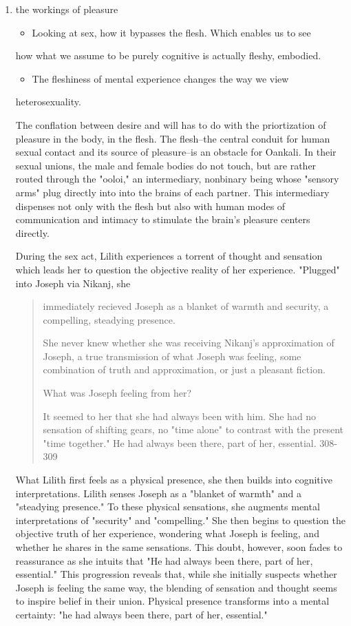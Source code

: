 \documentclass[11pt]{article}
\begin{document}
\begin{enumerate}
\item the workings of pleasure
\label{sec:org824832b}
\begin{itemize}
\item Looking at sex, how it bypasses the flesh. Which enables us to see
\end{itemize}
how what we assume to be purely cognitive is actually fleshy,
embodied. 
\begin{itemize}
\item The fleshiness of mental experience changes the way we view
\end{itemize}
heterosexuality. 

The conflation between desire and will has to do with the
priortization of pleasure in the body, in the flesh. The flesh--the
central conduit for human sexual contact and its source of
pleasure--is an obstacle for Oankali. In their sexual unions, the male
and female bodies do not touch, but are rather routed through the
"ooloi," an intermediary, nonbinary being whose "sensory arms" plug
directly into into the brains of each partner. This intermediary
dispenses not only with the flesh but also with human modes of
communication and intimacy to stimulate the brain's pleasure centers
directly.

During the sex act, Lilith experiences a torrent of thought and
sensation which leads her to question the objective reality of her
experience. "Plugged" into Joseph via Nikanj, she
\begin{quote}
immediately recieved Joseph as a blanket of warmth and security, a
compelling, steadying presence. 

She never knew whether she was receiving Nikanj's approximation of
Joseph, a true transmission of what Joseph was feeling, some
combination of truth and approximation, or just a pleasant fiction. 

What was Joseph feeling from her?

It seemed to her that she had always been with him. She had no
sensation of shifting gears, no "time alone" to contrast with the
present "time together." He had always been there, part of her,
essential. 308-309
\end{quote}
What Lilith first feels as a physical presence, she then builds into
cognitive interpretations. Lilith senses Joseph as a "blanket of
warmth" and a "steadying presence." To these physical sensations, she
augments mental interpretations of "security" and "compelling." She
then begins to question the objective truth of her experience,
wondering what Joseph is feeling, and whether he shares in the same
sensations. This doubt, however, soon fades to reassurance as she
intuits that "He had always been there, part of her, essential." This
progression reveals that, while she initially suspects whether Joseph
is feeling the same way, the blending of sensation and thought seems
to inspire belief in their union. Physical presence transforms into a
mental certainty: "he had always been there, part of her, essential."


\end{enumerate}
\end{document}
